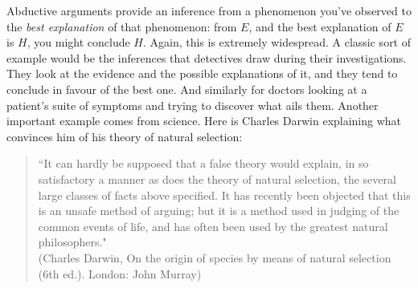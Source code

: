 Abductive arguments provide an inference from a phenomenon you've observed to the \emph{best explanation} of that phenomenon: from $E$, and the best explanation of $E$ is $H$, you might conclude $H$. Again, this is extremely widespread. A classic sort of example would be the inferences that detectives draw during their investigations. They look at the evidence and the possible explanations of it, and they tend to conclude in favour of the best one. And similarly for doctors looking at a patient's suite of symptoms and trying to discover what ails them. Another important example comes from science. Here is Charles Darwin explaining what convinces him of his theory of natural selection:
\begin{quotation}
``It can hardly be supposed that a false theory would explain, in so satisfactory a manner as does the theory of natural selection, the several large classes of facts above specified. It has recently been objected that this is an unsafe method of arguing; but it is a method used in judging of the common events of life, and has often been used by the greatest natural philosophers."\\ (Charles Darwin, On the origin of species by means of natural selection (6th ed.).
London: John Murray)
\end{quotation}








